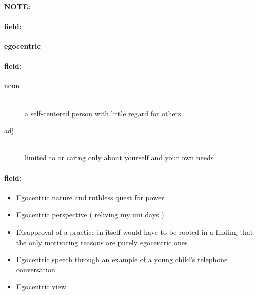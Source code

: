 \documentclass[12pt]{article}
\newenvironment{note}{\paragraph{NOTE:}}{}
\newenvironment{field}{\paragraph{field:}}{}
\begin{document}
\begin{note}
\begin{field}
\textbf{\large egocentric}
\end{field}


\begin{field}
\begin{description}
\item[noun] \hfill \\ 
a self-centered person with little regard for others

\item[adj] \hfill \\ 
limited to or caring only about yourself and your own needs

\end{description}
\end{field}

\begin{field}
\begin{itemize}
\item Egocentric nature and ruthless quest for power
\item Egocentric perspective ( reliving my uni days )
\item Disapproval of a practice in itself would have to be rooted in a finding that the only motivating reasons are purely egocentric ones
\item Egocentric speech through an example of a young child's telephone conversation
\item Egocentric view
\end{itemize}
\end{field}
\end{note}
\end{document}
